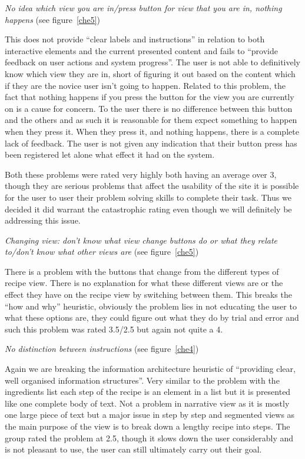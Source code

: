 \begin{center}
  \emph{No idea which view you are in/press button for view that you are in, nothing happens} (see figure~\ref{che5})
\end{center}

This does not provide ``clear labels and instructions'' in relation to both interactive elements and the current presented content and fails to “provide feedback on user actions and system progress”. The user is not able to definitively know which view they are in, short of figuring it out based on the content which if they are the novice user isn’t going to happen. Related to this problem, the fact that nothing happens if you press the button for the view you are currently on is a cause for concern. To the user there is no difference between this button and the others and as such it is reasonable for them expect something to happen when they press it. When they press it, and nothing happens, there is a complete lack of feedback. The user is not given any indication that their button press has been registered let alone what effect it had on the system. 

Both these problems were rated very highly both having an average over 3, though they are serious problems that affect the usability of the site it is possible for the user to user their problem solving skills to complete their task. Thus we decided it did warrant the catastrophic rating even though we will definitely be addressing this issue.

\begin{center}
  \emph{Changing view: don't know what view change buttons do or what they relate to/don't know what other views are} (see figure~\ref{che5})
\end{center}

There is a problem with the buttons that change from the different types of recipe view. There is no explanation for what these different views are or the effect they have on the recipe view by switching between them. This breaks the “how and why” heuristic, obviously the problem lies in not educating the user to what these options are, they could figure out what they do by trial and error and such this problem was rated 3.5/2.5 but again not quite a 4. 

\begin{center}
  \emph{No distinction between instructions} (see figure~\ref{che4})
\end{center}

Again we are breaking the information architecture heuristic of “providing clear, well organised information structures”. Very similar to the problem with the ingredients list each step of the recipe is an element in a list but it is presented like one complete body of text. Not a problem in narrative view as it is mostly one large piece of text but a major issue in step by step and segmented views as the main purpose of the view is to break down a lengthy recipe into steps. The group rated the problem at 2.5, though it slows down the user considerably and is not pleasant to use, the user can still ultimately carry out their goal.

